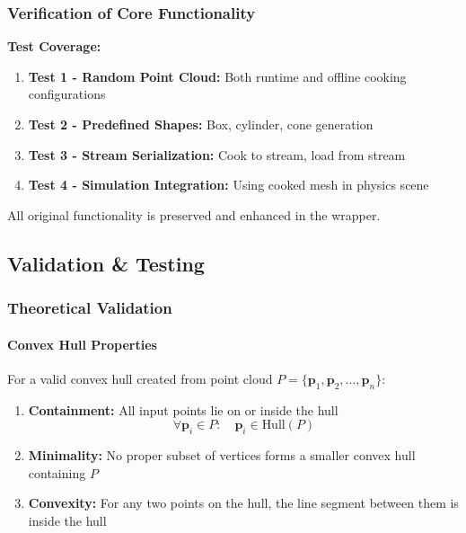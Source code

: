 \subsubsection{Verification of Core Functionality}

\textbf{Test Coverage:}
\begin{enumerate}
    \item \textbf{Test 1 - Random Point Cloud:} Both runtime and offline cooking configurations
    \item \textbf{Test 2 - Predefined Shapes:} Box, cylinder, cone generation
    \item \textbf{Test 3 - Stream Serialization:} Cook to stream, load from stream
    \item \textbf{Test 4 - Simulation Integration:} Using cooked mesh in physics scene
\end{enumerate}

All original functionality is preserved and enhanced in the wrapper.


\subsection{Validation \& Testing}

\subsubsection{Theoretical Validation}

\paragraph{Convex Hull Properties}

For a valid convex hull created from point cloud $P = \{\mathbf{p}_1, \mathbf{p}_2, ..., \mathbf{p}_n\}$:

\begin{enumerate}
    \item \textbf{Containment:} All input points lie on or inside the hull
    \begin{equation}
    \forall \mathbf{p}_i \in P: \quad \mathbf{p}_i \in \text{Hull}(P)
    \end{equation}

    \item \textbf{Minimality:} No proper subset of vertices forms a smaller convex hull containing $P$

    \item \textbf{Convexity:} For any two points on the hull, the line segment between them is inside the hull
\end{enumerate}

